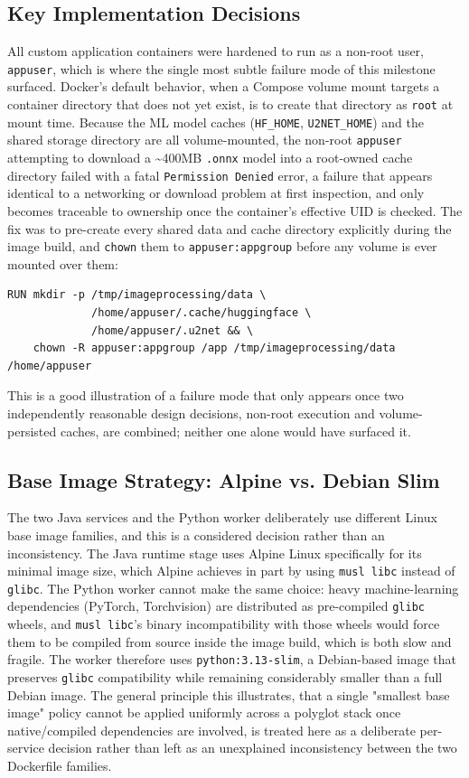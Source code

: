 \documentclass[twoside]{supsistudent}
\begin{document}
\subsection{Key Implementation Decisions}
All custom application containers were hardened to run as a non-root user, \texttt{appuser}, which is where the single most subtle failure mode of this milestone surfaced. Docker's default behavior, when a Compose volume mount targets a container directory that does not yet exist, is to create that directory as \texttt{root} at mount time. Because the ML model caches (\texttt{HF\_HOME}, \texttt{U2NET\_HOME}) and the shared storage directory are all volume-mounted, the non-root \texttt{appuser} attempting to download a \textasciitilde400MB \texttt{.onnx} model into a root-owned cache directory failed with a fatal \texttt{Permission Denied} error, a failure that appears identical to a networking or download problem at first inspection, and only becomes traceable to ownership once the container's effective UID is checked. The fix was to pre-create every shared data and cache directory explicitly during the image build, and \texttt{chown} them to \texttt{appuser:appgroup} before any volume is ever mounted over them:

\begin{verbatim}
RUN mkdir -p /tmp/imageprocessing/data \
             /home/appuser/.cache/huggingface \
             /home/appuser/.u2net && \
    chown -R appuser:appgroup /app /tmp/imageprocessing/data /home/appuser
\end{verbatim}

This is a good illustration of a failure mode that only appears once two independently reasonable design decisions, non-root execution and volume-persisted caches, are combined; neither one alone would have surfaced it.

\subsection{Base Image Strategy: Alpine vs. Debian Slim}
The two Java services and the Python worker deliberately use different Linux base image families, and this is a considered decision rather than an inconsistency. The Java runtime stage uses Alpine Linux specifically for its minimal image size, which Alpine achieves in part by using \texttt{musl libc} instead of \texttt{glibc}. The Python worker cannot make the same choice: heavy machine-learning dependencies (PyTorch, Torchvision) are distributed as pre-compiled \texttt{glibc} wheels, and \texttt{musl libc}'s binary incompatibility with those wheels would force them to be compiled from source inside the image build, which is both slow and fragile. The worker therefore uses \texttt{python:3.13-slim}, a Debian-based image that preserves \texttt{glibc} compatibility while remaining considerably smaller than a full Debian image. The general principle this illustrates, that a single "smallest base image" policy cannot be applied uniformly across a polyglot stack once native/compiled dependencies are involved, is treated here as a deliberate per-service decision rather than left as an unexplained inconsistency between the two Dockerfile families.
\end{document}
